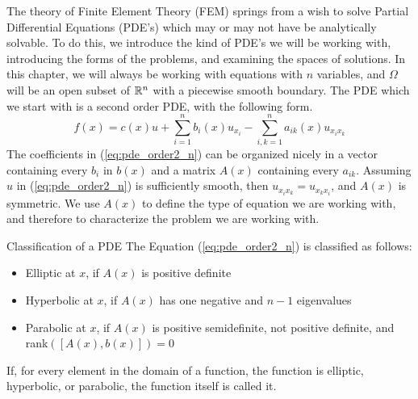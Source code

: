 The theory of Finite Element Theory (FEM) springs from a 
wish to solve Partial Differential Equations (PDE's) 
which may or may not have be analytically solvable. 
To do this, we introduce the kind of PDE's we will 
be working with, introducing the forms of the 
problems, and examining the spaces of solutions. 
In this chapter, we will always be working with 
equations with $n$ variables, and $\Omega$ will be 
an open subset of $\mathbb{R}^n$ with a piecewise smooth boundary.
The PDE which we start with is a second order PDE, 
with the following form.
\begin{equation}
	f(x) = c(x) u + \sum_{i=1}^{n}b_i(x)u_{x_{i}}
	- \sum_{i,k=1}^{n}a_{ik}(x)u_{x_i x_k}\label{eq:pde_order2_n}
\end{equation}
The coefficients in (\ref*{eq:pde_order2_n}) can be 
organized nicely in a vector containing every $b_i$ 
in $b(x)$
and a matrix $A(x)$ containing every $a_{ik}$.
Assuming $u$ in (\ref*{eq:pde_order2_n}) is sufficiently 
smooth, then $u_{x_i x_k} =u_{x_k x_i} $, and $A(x)$ is 
symmetric. 
We use $A(x)$ to define the type of equation we are working 
with, and therefore to characterize the problem we are 
working with.
\begin{defn}{Classification of a PDE}
	The Equation (\ref{eq:pde_order2_n}) is classified as follows:
	\begin{itemize}
		\item Elliptic at $x$, if $A(x)$ is positive definite
		\item Hyperbolic at $x$, if $A(x)$ has one negative and $n-1$ eigenvalues
		\item Parabolic at $x$, if $A(x)$ is positive semidefinite, not positive definite, and rank$([A(x), b(x)])=0$
	\end{itemize}

	If, for every element in the domain of a function, the function is elliptic, hyperbolic, or parabolic, the function itself is called it.
\end{defn}
